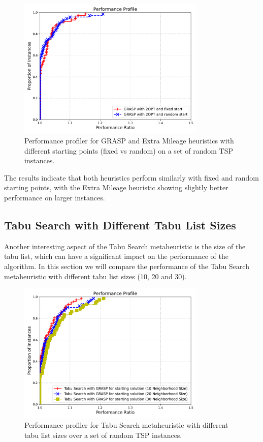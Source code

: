 \documentclass{article}
\begin{document}
\begin{figure}[!ht]
	\centering
	\includegraphics[width=0.8\textwidth]{plots/fixed_vs_random_start.pdf}
	\caption{Performance profiler for GRASP and Extra Mileage heuristics with different starting points (fixed vs random) on a set of random TSP instances.}
	\label{fig:grasp_vs_extra_mileage_starting_points}
\end{figure}
The results indicate that both heuristics perform similarly with fixed and random starting points, 
with the Extra Mileage heuristic showing slightly better performance on larger instances.

\subsection{Tabu Search with Different Tabu List Sizes}
Another interesting aspect of the Tabu Search metaheuristic is the size of the tabu list, which can have a significant impact on the performance of the algorithm.
In this section we will compare the performance of the Tabu Search metaheuristic with different tabu list sizes (10, 20 and 30).

\begin{figure}[!ht]
	\centering
	\includegraphics[width=0.8\textwidth]{plots/tabu_variable_neighbourhhod.pdf}
	\caption{Performance profiler for Tabu Search metaheuristic with different tabu list sizes over a set of random TSP instances.}
	\label{fig:tabu_search_tabu_list_sizes}
\end{figure}
\end{document}
